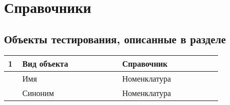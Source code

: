 \section{Справочники}
\subsection{Объекты тестирования, описанные в разделе}

\begin{longtable}{p{0.05\linewidth}p{0.4\linewidth}p{0.4\linewidth}}
    \hline
    1 & Вид объекта & Справочник \\
    \hline
     & Имя & Номенклатура \\
    \hline
    & Синоним  & Номенклатура \\
    \hline


    \bottomrule %
\end{longtable}